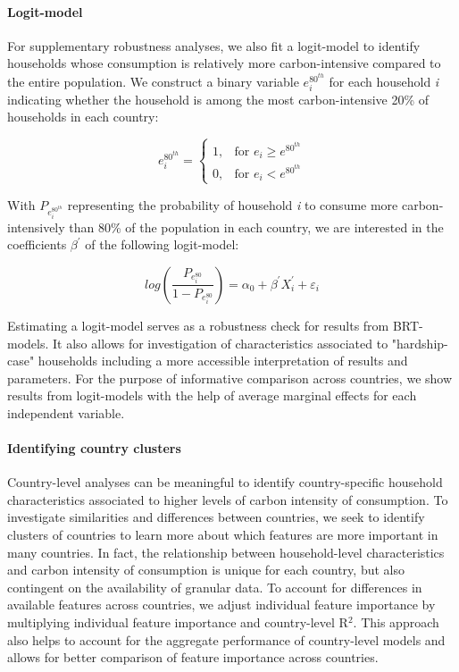\documentclass[12pt, a4paper]{article}
\begin{document}
\paragraph{Logit-model} For supplementary robustness analyses, we also fit a logit-model to identify households whose consumption is relatively more carbon-intensive compared to the entire population. We construct a binary variable $e_{i}^{80^{th}}$ for each household \textit{i} indicating whether the household is among the most carbon-intensive 20\% of households in each country:

\begin{equation}\label{eq:logit}
    e_{i}^{80^{th}} =
    \begin{cases}
    1, & \text{for }  e_{i} \geq e^{80^{th}} \\
    0, & \text{for }  e_{i} < e^{80^{th}}
    \end{cases}
\end{equation}

With $P_{e_{i}^{80^{th}}}$ representing the probability of household \textit{i} to consume more carbon-intensively than 80\% of the population in each country, we are interested in the coefficients $\beta^{'}$ of the following logit-model:

\begin{equation} \label{logit}
    log \left( \frac{P_{e_{i}^{80}}}{1 - P_{e_{i}^{80}}} \right) = \alpha_{0} + \beta^{'} X_{i}^{'} + \varepsilon_{i}
\end{equation}

Estimating a logit-model serves as a robustness check for results from BRT-models. It also allows for investigation of characteristics associated to "hardship-case" households including a more accessible interpretation of results and parameters. For the purpose of informative comparison across countries, we show results from logit-models with the help of average marginal effects for each independent variable.

\paragraph{Identifying country clusters} Country-level analyses can be meaningful to identify country-specific household characteristics associated to higher levels of carbon intensity of consumption. To investigate similarities and differences between countries, we seek to identify clusters of countries to learn more about which features are more important in many countries. In fact, the relationship between household-level characteristics and carbon intensity of consumption is unique for each country, but also contingent on the availability of granular data. To account for differences in available features across countries, we adjust individual feature importance by multiplying individual feature importance and country-level R$^{2}$. This approach also helps to account for the aggregate performance of country-level models and allows for better comparison of feature importance across countries.
\end{document}
